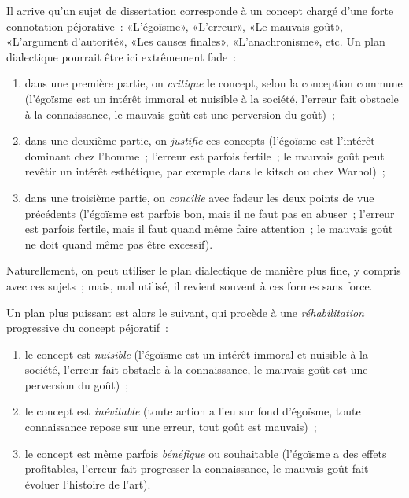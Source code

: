 \documentclass[a4paper,11pt]{article}
\begin{document}
Il arrive qu'un sujet de dissertation corresponde à un concept chargé
d'une forte connotation péjorative~: «L'égoïsme», «L'erreur», «Le
mauvais goût», «L'argument d'autorité», «Les causes finales»,
«L'anachronisme», etc. Un plan dialectique pourrait être ici extrêmement
fade~:
\begin{enumerate}
\item dans une première partie, on \emph{critique} le concept, selon la
  conception commune (l'égoïsme est un intérêt immoral et nuisible à la
  société, l'erreur fait obstacle à la connaissance, le mauvais goût est
  une perversion du goût)~;
\item dans une deuxième partie, on \emph{justifie} ces concepts
  (l'égoïsme est l'intérêt dominant chez l'homme~; l'erreur est parfois
  fertile~; le mauvais goût peut revêtir un intérêt esthétique, par
  exemple dans le kitsch ou chez Warhol)~;
\item dans une troisième partie, on \emph{concilie} avec fadeur les deux
  points de vue précédents (l'égoïsme est parfois bon, mais il ne faut
  pas en abuser~; l'erreur est parfois fertile, mais il faut quand même
  faire attention~; le mauvais goût ne doit quand même pas être
  excessif).
\end{enumerate}

Naturellement, on peut utiliser le plan dialectique de manière plus
fine, y compris avec ces sujets~; mais, mal utilisé, il revient souvent
à ces formes sans force.

\par

Un plan plus puissant est alors le suivant, qui procède à une
\emph{réhabilitation} progressive du concept péjoratif~:

\begin{enumerate}
\item le concept est \emph{nuisible} (l'égoïsme est un intérêt immoral
  et nuisible à la société, l'erreur fait obstacle à la connaissance, le
  mauvais goût est une perversion du goût)~;
\item le concept est \emph{inévitable} (toute action a lieu sur fond
  d'égoïsme, toute connaissance repose sur une erreur, tout goût est
  mauvais)~;
\item le concept est même parfois \emph{bénéfique} ou souhaitable
  (l'égoïsme a des effets profitables, l'erreur fait progresser la
  connaissance, le mauvais goût fait évoluer l'histoire de l'art).
\end{enumerate}
\end{document}
